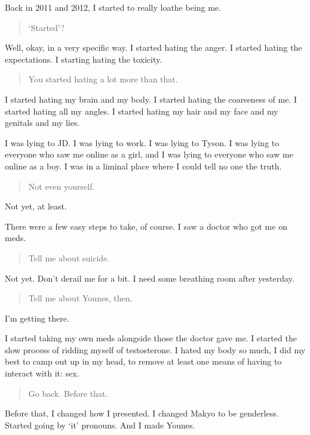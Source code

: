 Back in 2011 and 2012, I started to really loathe being me.

\begin{quote}
`Started'?
\end{quote}

Well, okay, in a very specific way. I started hating the anger. I started hating the expectations. I starting hating the toxicity.

\begin{quote}
You started hating a lot more than that.
\end{quote}

I started hating my brain and my body. I started hating the coarseness of me. I started hating all my angles. I started hating my hair and my face and my genitals and my lies.

I was lying to JD. I was lying to work. I was lying to Tyson. I was lying to everyone who saw me online as a girl, and I was lying to everyone who saw me online as a boy. I was in a liminal place where I could tell no one the truth.

\begin{quote}
Not even yourself.
\end{quote}

Not yet, at least.

There were a few easy steps to take, of course. I saw a doctor who got me on meds.

\begin{quote}
Tell me about suicide.
\end{quote}

Not yet. Don't derail me for a bit. I need some breathing room after yesterday.

\begin{quote}
Tell me about Younes, then.
\end{quote}

I'm getting there.

I started taking my own meds alongside those the doctor gave me. I started the slow process of ridding myself of testosterone. I hated my body so much, I did my best to camp out up in my head, to remove at least one means of having to interact with it: sex.

\begin{quote}
Go back. Before that.
\end{quote}

Before that, I changed how I presented. I changed Makyo to be genderless. Started going by `it' pronouns. And I made Younes.

